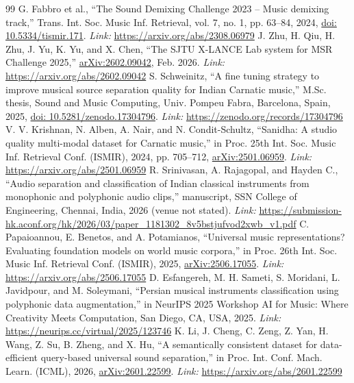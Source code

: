\documentclass[12pt,a4paper]{article}
\begin{document}
\begin{thebibliography}{99}
 G. Fabbro et al., ``The Sound Demixing Challenge 2023 -- Music demixing track,'' Trans. Int. Soc. Music Inf. Retrieval, vol. 7, no. 1, pp. 63--84, 2024, \href{https://doi.org/10.5334/tismir.171}{doi: 10.5334/tismir.171}. \newline\textit{Link:} \url{https://arxiv.org/abs/2308.06979}
 J. Zhu, H. Qiu, H. Zhu, J. Yu, K. Yu, and X. Chen, ``The SJTU X-LANCE Lab system for MSR Challenge 2025,'' \href{https://arxiv.org/abs/2602.09042}{arXiv:2602.09042}, Feb. 2026. \newline\textit{Link:} \url{https://arxiv.org/abs/2602.09042}
 S. Schweinitz, ``A fine tuning strategy to improve musical source separation quality for Indian Carnatic music,'' M.Sc. thesis, Sound and Music Computing, Univ. Pompeu Fabra, Barcelona, Spain, 2025, \href{https://doi.org/10.5281/zenodo.17304796}{doi: 10.5281/zenodo.17304796}. \newline\textit{Link:} \url{https://zenodo.org/records/17304796}
 V. V. Krishnan, N. Alben, A. Nair, and N. Condit-Schultz, ``Sanidha: A studio quality multi-modal dataset for Carnatic music,'' in Proc. 25th Int. Soc. Music Inf. Retrieval Conf. (ISMIR), 2024, pp. 705--712, \href{https://arxiv.org/abs/2501.06959}{arXiv:2501.06959}. \newline\textit{Link:} \url{https://arxiv.org/abs/2501.06959}
 R. Srinivasan, A. Rajagopal, and Hayden C., ``Audio separation and classification of Indian classical instruments from monophonic and polyphonic audio clips,'' manuscript, SSN College of Engineering, Chennai, India, 2026 (venue not stated). \newline\textit{Link:} \url{https://submission-hk.aconf.org/hk/2026/03/paper_1181302_8v5bstjufvod2xwb_v1.pdf}
 C. Papaioannou, E. Benetos, and A. Potamianos, ``Universal music representations? Evaluating foundation models on world music corpora,'' in Proc. 26th Int. Soc. Music Inf. Retrieval Conf. (ISMIR), 2025, \href{https://arxiv.org/abs/2506.17055}{arXiv:2506.17055}. \newline\textit{Link:} \url{https://arxiv.org/abs/2506.17055}
 D. Esfangereh, M. H. Sameti, S. Moridani, L. Javidpour, and M. Soleymani, ``Persian musical instruments classification using polyphonic data augmentation,'' in NeurIPS 2025 Workshop AI for Music: Where Creativity Meets Computation, San Diego, CA, USA, 2025. \newline\textit{Link:} \url{https://neurips.cc/virtual/2025/123746}
 K. Li, J. Cheng, C. Zeng, Z. Yan, H. Wang, Z. Su, B. Zheng, and X. Hu, ``A semantically consistent dataset for data-efficient query-based universal sound separation,'' in Proc. Int. Conf. Mach. Learn. (ICML), 2026, \href{https://arxiv.org/abs/2601.22599}{arXiv:2601.22599}. \newline\textit{Link:} \url{https://arxiv.org/abs/2601.22599}

\end{thebibliography}
\end{document}
